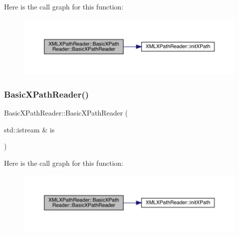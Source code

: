 Here is the call graph for this function\+:\nopagebreak
\begin{figure}[H]
\begin{center}
\leavevmode
\includegraphics[width=350pt]{d6/dbf/classXMLXPathReader_1_1BasicXPathReader_a940138f7f52261b6190f2f23b73c648f_cgraph}
\end{center}
\end{figure}
\mbox{\label{classXMLXPathReader_1_1BasicXPathReader_ae50fd4b786cbc875ba1ca6e04a62815f}} 
\subsubsection{\texorpdfstring{BasicXPathReader()}{BasicXPathReader()}\hspace{0.1cm}{\footnotesize\ttfamily [2/8]}}
{\footnotesize\ttfamily Basic\+X\+Path\+Reader\+::\+Basic\+X\+Path\+Reader (\begin{DoxyParamCaption}\item[{std\+::istream \&}]{is }\end{DoxyParamCaption})}

Here is the call graph for this function\+:\nopagebreak
\begin{figure}[H]
\begin{center}
\leavevmode
\includegraphics[width=350pt]{d6/dbf/classXMLXPathReader_1_1BasicXPathReader_ae50fd4b786cbc875ba1ca6e04a62815f_cgraph}
\end{center}
\end{figure}
\mbox{\label{classXMLXPathReader_1_1BasicXPathReader_ad8df69bf440f9a9602fcba52782489f0}} 
